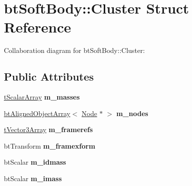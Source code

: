 \hypertarget{structbt_soft_body_1_1_cluster}{\section{bt\+Soft\+Body\+:\+:Cluster Struct Reference}
\label{structbt_soft_body_1_1_cluster}
}


Collaboration diagram for bt\+Soft\+Body\+:\+:Cluster\+:
\subsection*{Public Attributes}
\begin{DoxyCompactItemize}
\item 
\hypertarget{structbt_soft_body_1_1_cluster_ad06448becadded3ea08cab6e75568df8}{\hyperlink{classbt_aligned_object_array}{t\+Scalar\+Array} {\bfseries m\+\_\+masses}}\label{structbt_soft_body_1_1_cluster_ad06448becadded3ea08cab6e75568df8}

\item 
\hypertarget{structbt_soft_body_1_1_cluster_a5d67503d77a08f0bf7b974f08cd01f01}{\hyperlink{classbt_aligned_object_array}{bt\+Aligned\+Object\+Array}$<$ \hyperlink{structbt_soft_body_1_1_node}{Node} $\ast$ $>$ {\bfseries m\+\_\+nodes}}\label{structbt_soft_body_1_1_cluster_a5d67503d77a08f0bf7b974f08cd01f01}

\item 
\hypertarget{structbt_soft_body_1_1_cluster_a3893f7524acfdea8831df7708ad39611}{\hyperlink{classbt_aligned_object_array}{t\+Vector3\+Array} {\bfseries m\+\_\+framerefs}}\label{structbt_soft_body_1_1_cluster_a3893f7524acfdea8831df7708ad39611}

\item 
\hypertarget{structbt_soft_body_1_1_cluster_addf1cd863cb3f8c8df8bf03796dbba61}{bt\+Transform {\bfseries m\+\_\+framexform}}\label{structbt_soft_body_1_1_cluster_addf1cd863cb3f8c8df8bf03796dbba61}

\item 
\hypertarget{structbt_soft_body_1_1_cluster_aee6721b33ced03dce7eb642bbb28f43b}{bt\+Scalar {\bfseries m\+\_\+idmass}}\label{structbt_soft_body_1_1_cluster_aee6721b33ced03dce7eb642bbb28f43b}

\item 
\hypertarget{structbt_soft_body_1_1_cluster_aa6ae5e2414ffb4f3a60e2d9c62990ebe}{bt\+Scalar {\bfseries m\+\_\+imass}}\label{structbt_soft_body_1_1_cluster_aa6ae5e2414ffb4f3a60e2d9c62990ebe}


\end{DoxyCompactItemize}

